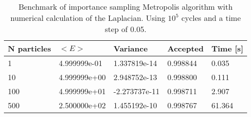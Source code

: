 \begin{table}[h!]
\centering 
\begin{tabular}{|l|l|l|l|l|}
\hline 
N particles & $<E>$ & Variance & Accepted & Time [s]\\ 
 \hline 
1 & 4.999999e-01 & 1.337819e-14 & 0.998844 & 0.035 \\ \hline 
10 & 4.999999e+00 & 2.948752e-13 & 0.998800 & 0.111 \\ \hline 
100 & 4.999999e+01 & -2.273737e-11 & 0.998711 & 2.907 \\ \hline 
500 & 2.500000e+02 & 1.455192e-10 & 0.998767 & 61.364 \\ \hline 
\end{tabular}
\caption{%
	  Benchmark of importance sampling Metropolis algorithm %
	  with numerical calculation of the Laplacian. Using %
	  $10^5$ cycles and a time step of 0.05.%
	}
\label{tab:in1} 
\end{table} 
